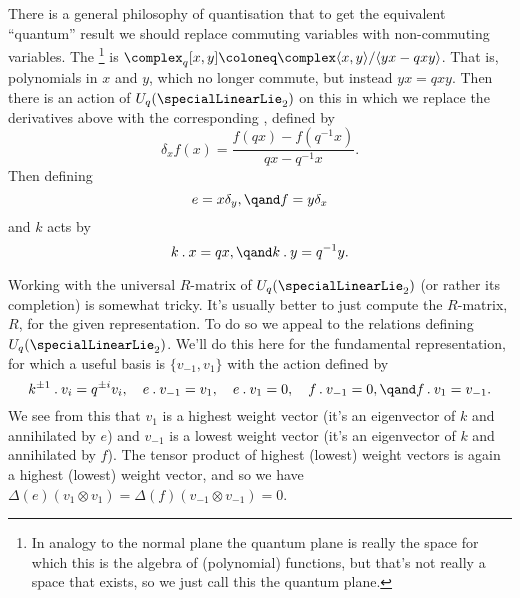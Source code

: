 \documentclass[fleqn]{NotesClass}
\newcommand{\action}{\mathbin{.}}
\begin{document}
    There is a general philosophy of quantisation that to get the equivalent \enquote{quantum} result we should replace commuting variables with non-commuting variables.
    The \footnote{In analogy to the normal plane the quantum plane is really the space for which this is the algebra of (polynomial) functions, but that's not really a space that exists, so we just call this the quantum plane.} is \(\complex_q[x, y] \coloneq \complex \langle x, y\rangle / \langle yx - qxy\rangle\).
    That is, polynomials in \(x\) and \(y\), which no longer commute, but instead \(yx = qxy\).
    Then there is an action of \(U_q(\specialLinearLie_2)\) on this in which we replace the derivatives above with the corresponding , defined by
    \begin{equation}
        \delta_x f(x) = \frac{f(qx) - f(q^{-1}x)}{qx - q^{-1}x}.
    \end{equation}
    Then defining
    \begin{equation}
        e = x \delta_y, \qand f = y \delta_x
    \end{equation}
    and \(k\) acts by
    \begin{equation}
        k \action x = qx, \qand k \action y = q^{-1}y.
    \end{equation}
    
    Working with the universal \(R\)-matrix of \(U_q(\specialLinearLie_2)\) (or rather its completion) is somewhat tricky.
    It's usually better to just compute the \(R\)-matrix, \(R\), for the given representation.
    To do so we appeal to the relations defining \(U_q(\specialLinearLie_2)\).
    We'll do this here for the fundamental representation, for which a useful basis is \(\{v_{-1}, v_1\}\) with the action defined by
    \begin{equation*}
        k^{\pm 1} \action v_i = q^{\pm i} v_i, \quad e \action v_{-1} = v_1, \quad e \action v_1 = 0, \quad f \action v_{-1} = 0, \qand f \action v_1 = v_{-1}.
    \end{equation*}
    We see from this that \(v_1\) is a highest weight vector (it's an eigenvector of \(k\) and annihilated by \(e\)) and \(v_{-1}\) is a lowest weight vector (it's an eigenvector of \(k\) and annihilated by \(f\)).
    The tensor product of highest (lowest) weight vectors is again a highest (lowest) weight vector, and so we have \(\Delta(e)(v_1 \otimes v_1) = \Delta(f)(v_{-1} \otimes v_{-1}) = 0\).
    
\end{document}
